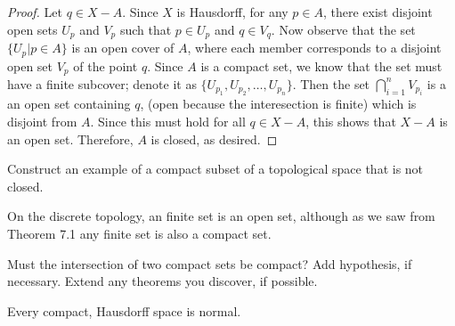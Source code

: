\documentclass[a4paper,12pt,twoside]{hmcpset}
\begin{document}
\begin{proof}
    Let $q \in X - A.$ Since $X$ is Hausdorff, for any $p \in A$,
    there exist disjoint open sets $U_p$ and $V_p$ such that $p \in
    U_p$ and $q \in V_q$. Now observe that the set $\{U_p | p \in A\}$
    is an open cover of $A$, where each member corresponds to a
    disjoint open set $V_p$ of the point $q$. Since $A$ is a compact
    set, we know that the set must have a finite subcover; denote it
    as $\{U_{p_1}, U_{p_2}, \dots, U_{p_n}\}$. Then the set
    $\bigcap_{i = 1}^n V_{p_i}$ is a an open set containing $q$, (open
    because the interesection is finite) which is disjoint from $A$.
    Since this must hold for all $q \in X - A$, this shows that $X -
    A$ is an open set. Therefore, $A$ is closed, as desired. 
\end{proof}

\begin{exercise}[Exercise 7.10]
Construct an example of a compact subset of a
topological space that is not closed. 
\end{exercise}

\begin{solution}
On the discrete topology, an finite set is an open set, although as we
saw from Theorem 7.1 any finite set is also a compact set. 
\end{solution}

\begin{exercise}[Exercise 7.11]
Must the intersection of two compact sets be compact? Add hypothesis,
if necessary. Extend any theorems you discover, if possible. 
\end{exercise}

\begin{problem}[Theorem 7.12] Every compact, Hausdorff space is
    normal.
\end{problem}
\end{document}
